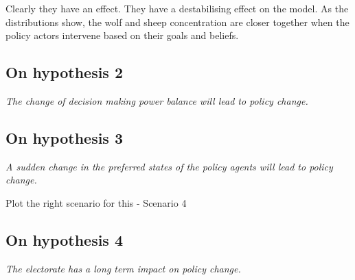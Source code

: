 \documentclass[12pt]{article}
\begin{document}
Clearly they have an effect. They have a destabilising effect on the model. As the distributions show, the wolf and sheep concentration are closer together when the policy actors intervene based on their goals and beliefs.

\subsection{On hypothesis 2}
\label{ssec:H2}

\emph{The change of decision making power balance will lead to policy change.}


\subsection{On hypothesis 3}
\label{ssec:H3}

\emph{A sudden change in the preferred states of the policy agents will lead to policy change.}

Plot the right scenario for this - Scenario 4


\subsection{On hypothesis 4}
\label{ssec:H4}

\emph{The electorate has a long term impact on policy change.}


 

\end{document}

